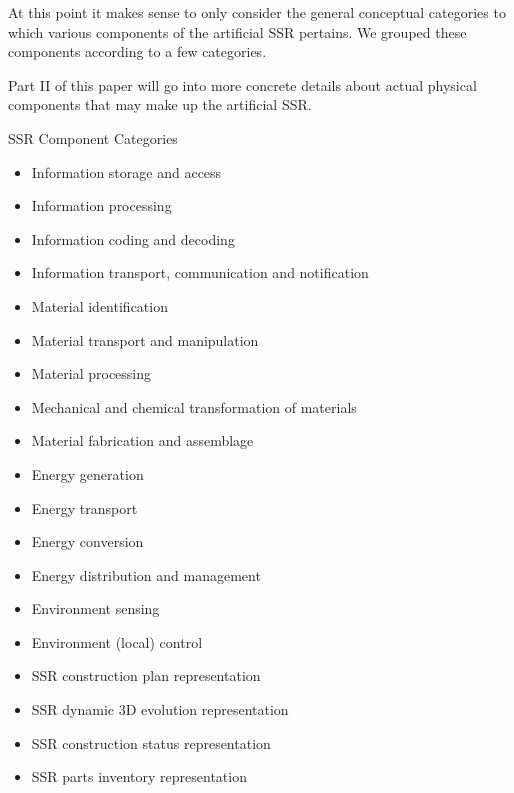 At this point it makes sense to only consider the general conceptual
categories to which various components of the artificial SSR pertains.
We grouped these components according to a few categories.

Part II of this paper will go into more concrete details about actual
physical components that may make up the artificial SSR.

SSR Component Categories %

\begin{itemize}
\item Information storage and access
\item Information processing
\item Information coding and decoding
\item Information transport, communication and notification
\end{itemize}

\bigskip

\begin{itemize}
\item Material identification
\item Material transport and manipulation
\item Material processing
\item Mechanical and chemical transformation of materials
\item Material fabrication and assemblage
\end{itemize}

\bigskip

\begin{itemize}
\item Energy generation
\item Energy transport
\item Energy conversion
\item Energy distribution and management
\end{itemize}

\bigskip

\begin{itemize}
\item Environment sensing
\item Environment (local) control
\end{itemize}

\begin{itemize}
\item SSR construction plan representation
\item SSR dynamic 3D evolution representation
\item SSR construction status representation
\item SSR parts inventory representation
\end{itemize}

